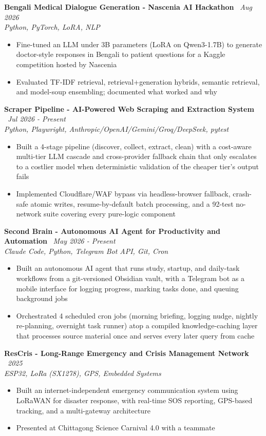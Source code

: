 \documentclass[10.5pt,a4paper]{article}
\newenvironment{tightitemize}{
  \begin{itemize}[leftmargin=15pt, itemsep=0pt, parsep=0pt, topsep=1pt]
}{
  \end{itemize}
}
\newcommand{\entrysimple}[2]{%
  \textbf{#1} \textbar\ \textit{#2}\\[1pt]
}
\begin{document}
\entrysimple{Bengali Medical Dialogue Generation - Nascenia AI Hackathon}{Aug 2026}
\textit{Python, PyTorch, LoRA, NLP}
\begin{tightitemize}
  \item Fine-tuned an LLM under 3B parameters (LoRA on Qwen3-1.7B) to generate doctor-style responses in Bengali to patient questions for a Kaggle competition hosted by Nascenia
  \item Evaluated TF-IDF retrieval, retrieval+generation hybrids, semantic retrieval, and model-soup ensembling; documented what worked and why
\end{tightitemize}

\entrysimple{Scraper Pipeline - AI-Powered Web Scraping and Extraction System}{Jul 2026 - Present}
\textit{Python, Playwright, Anthropic/OpenAI/Gemini/Groq/DeepSeek, pytest}
\begin{tightitemize}
  \item Built a 4-stage pipeline (discover, collect, extract, clean) with a cost-aware multi-tier LLM cascade and cross-provider fallback chain that only escalates to a costlier model when deterministic validation of the cheaper tier's output fails
  \item Implemented Cloudflare/WAF bypass via headless-browser fallback, crash-safe atomic writes, resume-by-default batch processing, and a 92-test no-network suite covering every pure-logic component
\end{tightitemize}

\entrysimple{Second Brain - Autonomous AI Agent for Productivity and Automation}{May 2026 - Present}
\textit{Claude Code, Python, Telegram Bot API, Git, Cron}
\begin{tightitemize}
  \item Built an autonomous AI agent that runs study, startup, and daily-task workflows from a git-versioned Obsidian vault, with a Telegram bot as a mobile interface for logging progress, marking tasks done, and queuing background jobs
  \item Orchestrated 4 scheduled cron jobs (morning briefing, logging nudge, nightly re-planning, overnight task runner) atop a compiled knowledge-caching layer that processes source material once and serves every later query from cache
\end{tightitemize}

\entrysimple{ResCris - Long-Range Emergency and Crisis Management Network}{2025}
\textit{ESP32, LoRa (SX1278), GPS, Embedded Systems}
\begin{tightitemize}
  \item Built an internet-independent emergency communication system using LoRaWAN for disaster response, with real-time SOS reporting, GPS-based tracking, and a multi-gateway architecture
  \item Presented at Chittagong Science Carnival 4.0 with a teammate
\end{tightitemize}
\end{document}
